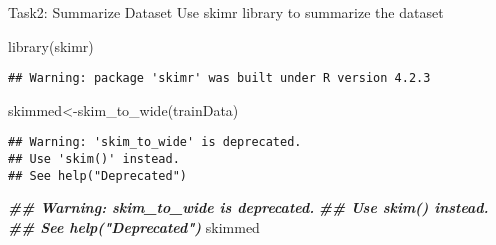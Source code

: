 \documentclass[
]{article}
\newenvironment{Shaded}{\begin{snugshade}}{\end{snugshade}}
\newcommand{\AttributeTok}[1]{\textcolor[rgb]{0.77,0.63,0.00}{#1}}
\newcommand{\CommentTok}[1]{\textcolor[rgb]{0.56,0.35,0.01}{\textit{#1}}}
\newcommand{\ConstantTok}[1]{\textcolor[rgb]{0.00,0.00,0.00}{#1}}
\newcommand{\DecValTok}[1]{\textcolor[rgb]{0.00,0.00,0.81}{#1}}
\newcommand{\DocumentationTok}[1]{\textcolor[rgb]{0.56,0.35,0.01}{\textbf{\textit{#1}}}}
\newcommand{\FloatTok}[1]{\textcolor[rgb]{0.00,0.00,0.81}{#1}}
\newcommand{\FunctionTok}[1]{\textcolor[rgb]{0.00,0.00,0.00}{#1}}
\newcommand{\NormalTok}[1]{#1}
\newcommand{\OtherTok}[1]{\textcolor[rgb]{0.56,0.35,0.01}{#1}}
\newcommand{\SpecialCharTok}[1]{\textcolor[rgb]{0.00,0.00,0.00}{#1}}
\begin{document}
\begin{Shaded}
\end{Shaded}

Task2: Summarize Dataset Use skimr library to summarize the dataset

\begin{Shaded}
\begin{Highlighting}[]
\FunctionTok{library}\NormalTok{(skimr)}
\end{Highlighting}
\end{Shaded}

\begin{verbatim}
## Warning: package 'skimr' was built under R version 4.2.3
\end{verbatim}

\begin{Shaded}
\begin{Highlighting}[]
\NormalTok{skimmed}\OtherTok{\textless{}{-}}\FunctionTok{skim\_to\_wide}\NormalTok{(trainData)}
\end{Highlighting}
\end{Shaded}

\begin{verbatim}
## Warning: 'skim_to_wide' is deprecated.
## Use 'skim()' instead.
## See help("Deprecated")
\end{verbatim}

\begin{Shaded}
\begin{Highlighting}[]
\DocumentationTok{\#\# Warning: \textquotesingle{}skim\_to\_wide\textquotesingle{} is deprecated.}
\DocumentationTok{\#\# Use \textquotesingle{}skim()\textquotesingle{} instead.}
\DocumentationTok{\#\# See help("Deprecated")}
\NormalTok{skimmed}
\end{Highlighting}
\end{Shaded}
\end{document}
